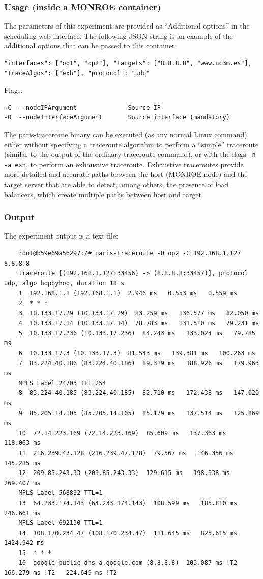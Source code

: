 \documentclass[a4paper,10pt]{article}
\newcommand{\VerbatimFont}{\footnotesize}
\newcommand{\monroe}{MONROE}
\newcommand{\identifier}[1]{{\texttt{\small{#1}}}}
\begin{document}
\subsubsection{Usage (inside a \monroe{} container)}

The parameters of this experiment are provided as ``Additional options'' in the scheduling web interface.
The following JSON string is an example of the additional options that can be passed to this container:
\begin{verbatim}
"interfaces": ["op1", "op2"], "targets": ["8.8.8.8", "www.uc3m.es"],
"traceAlgos": ["exh"], "protocol": "udp"
\end{verbatim}

Flags:
\begin{verbatim}
-C  --nodeIPArgument              Source IP
-O  --nodeInterfaceArgument       Source interface (mandatory)
\end{verbatim}

The paris-traceroute binary can be executed (as any normal Linux command) either without specifying a traceroute algorithm to perform a ``simple'' traceroute (similar to the output of the ordinary traceroute command), or with the flags \identifier{-n -a exh}, to perform an exhaustive traceroute.
Exhaustive traceroutes provide more detailed and accurate paths between the host (\monroe{} node) and the target server that are able to detect, among others, the presence of load balancers, which create multiple paths between host and target.

\subsubsection{Output}

The experiment output is a text file:

{\VerbatimFont
	\begin{verbatim}
	root@b59e69a56297:/# paris-traceroute -O op2 -C 192.168.1.127 8.8.8.8
	traceroute [(192.168.1.127:33456) -> (8.8.8.8:33457)], protocol udp, algo hopbyhop, duration 18 s
	1  192.168.1.1 (192.168.1.1)  2.946 ms   0.553 ms   0.559 ms 
	2  * * *
	3  10.133.17.29 (10.133.17.29)  83.259 ms   136.577 ms   82.050 ms 
	4  10.133.17.14 (10.133.17.14)  78.783 ms   131.510 ms   79.231 ms 
	5  10.133.17.236 (10.133.17.236)  84.243 ms   133.024 ms   79.785 ms 
	6  10.133.17.3 (10.133.17.3)  81.543 ms   139.381 ms   100.263 ms 
	7  83.224.40.186 (83.224.40.186)  89.319 ms   188.926 ms   179.963 ms 
	MPLS Label 24703 TTL=254
	8  83.224.40.185 (83.224.40.185)  82.710 ms   172.438 ms   147.020 ms 
	9  85.205.14.105 (85.205.14.105)  85.179 ms   137.514 ms   125.869 ms 
	10  72.14.223.169 (72.14.223.169)  85.609 ms   137.363 ms   118.063 ms 
	11  216.239.47.128 (216.239.47.128)  79.567 ms   146.356 ms   145.285 ms 
	12  209.85.243.33 (209.85.243.33)  129.615 ms   198.938 ms   269.407 ms 
	MPLS Label 568892 TTL=1
	13  64.233.174.143 (64.233.174.143)  108.599 ms   185.810 ms   246.661 ms 
	MPLS Label 692130 TTL=1
	14  108.170.234.47 (108.170.234.47)  111.645 ms   825.615 ms   1424.942 ms 
	15  * * *
	16  google-public-dns-a.google.com (8.8.8.8)  103.087 ms !T2   166.279 ms !T2   224.649 ms !T2 
	\end{verbatim}
}
\end{document}
